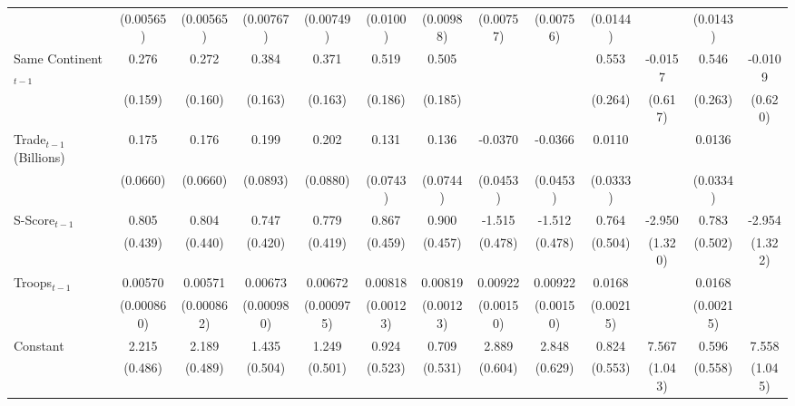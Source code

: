 \begin{table}[htbp]
\begin{tabular}{l*{12}{c}}
                                           & (0.00565)     & (0.00565)     & (0.00767)     & (0.00749)     & (0.0100)      & (0.00988)     & (0.00757)     & (0.00756)      & (0.0144)       & & (0.0143)       &  \\
[0.25em]
Same Continent$_{t-1}$ & 0.276\sym{\dagger} & 0.272\sym{\dagger} & 0.384\sym{*} & 0.371\sym{*} & 0.519\sym{**}&  0.505\sym{**}& & & 0.553\sym{*} & -0.0157 & 0.546\sym{*} & -0.0109 \\
                       & (0.159)            & (0.160)            & (0.163)      & (0.163)      & (0.186)      &  (0.185)      & & & (0.264)      & (0.617) & (0.263)      & (0.620)  \\
[0.25em]
Trade$_{t-1}$ (Billions) & 0.175\sym{**}& 0.176\sym{**}& 0.199\sym{*} & 0.202\sym{*} & 0.131\sym{\dagger} & 0.136\sym{\dagger} & -0.0370 & -0.0366 & 0.0110  & & 0.0136  & \\
                         & (0.0660)     & (0.0660)     & (0.0893)     & (0.0880)     & (0.0743)           & (0.0744)           & (0.0453)& (0.0453)& (0.0333)& & (0.0334)&        \\
[0.25em]
S-Score$_{t-1}$ & 0.805\sym{\dagger} & 0.804\sym{\dagger} & 0.747\sym{\dagger} & 0.779\sym{\dagger} & 0.867\sym{\dagger} & 0.900\sym{*} & -1.515\sym{**}& -1.512\sym{**} & 0.764  & -2.950\sym{*} & 0.783  & -2.954\sym{*} \\
                & (0.439)            & (0.440)            & (0.420)            & (0.419)            & (0.459)            & (0.457)      & (0.478)       & (0.478)        & (0.504)& (1.320)       & (0.502)& (1.322)  \\
[0.25em]
Troops$_{t-1}$ & 0.00570\sym{**}& 0.00571\sym{**}& 0.00673\sym{**}& 0.00672\sym{**}& 0.00818\sym{**}& 0.00819\sym{**}& 0.00922\sym{**}& 0.00922\sym{**} & 0.0168\sym{**}& & 0.0168\sym{**} & \\
               & (0.000860)     & (0.000862)     & (0.000980)     & (0.000975)     & (0.00123)      & (0.00123)      & (0.00150)      & (0.00150)       & (0.00215)     & & (0.00215)      & \\
[0.25em]
Constant & 2.215\sym{**}& 2.189\sym{**}& 1.435\sym{**}& 1.249\sym{*} & 0.924\sym{\dagger} & 0.709  &  2.889\sym{**}& 2.848\sym{**} & 0.824  & 7.567\sym{**} & 0.596  & 7.558\sym{**} \\
         & (0.486)      & (0.489)      & (0.504)      & (0.501)      & (0.523)            & (0.531)& (0.604)       & (0.629)       & (0.553)& (1.043)       & (0.558)& (1.045)  \\

\end{tabular}
\end{table}
